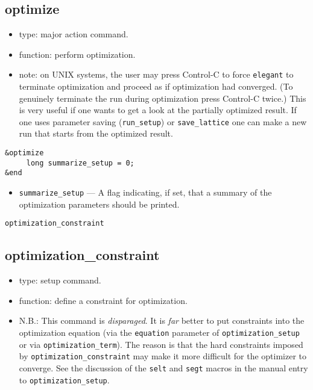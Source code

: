 \documentclass[11pt]{article}
\begin{document}
\subsection{optimize \label{subsec:optimize}}

\begin{itemize}
\item type: major action command.
\item function: perform optimization.
\item note: on UNIX systems, the user may press Control-C to force
\verb|elegant| to terminate optimization and proceed as if
optimization had converged.  (To genuinely terminate the run during
optimization press Control-C twice.) This is very useful if one wants
to get a look at the partially optimized result.  If one uses parameter
saving (\verb|run_setup|) or \verb|save_lattice| one can make a new
run that starts from the optimized result.

\end{itemize}

\begin{verbatim}
&optimize
     long summarize_setup = 0;
&end
\end{verbatim}

\begin{itemize}

\item \verb|summarize_setup| --- A flag indicating, if set, that a
summary of the optimization parameters should be printed.
\end{itemize}

\begin{latexonly}
\newpage
\begin{center}{\Large\verb|optimization_constraint|}\end{center}
\end{latexonly}
\subsection{optimization\_constraint \label{subsec:optimizationconstraint}}

\begin{itemize}
\item type: setup command.
\item function: define a constraint for optimization.
\item N.B.: This command is {\em disparaged}. It is {\em far} better to put constraints
	into the optimization equation (via the \verb|equation| parameter of
	\verb|optimization_setup| or via \verb|optimization_term|).  The reason
	is that the hard constraints imposed by \verb|optimization_constraint|
	may make it more difficult for the optimizer to converge.  See the discussion of the
        \verb|selt| and \verb|segt| macros in the manual entry to \verb|optimization_setup|.
\end{itemize}
\end{document}
